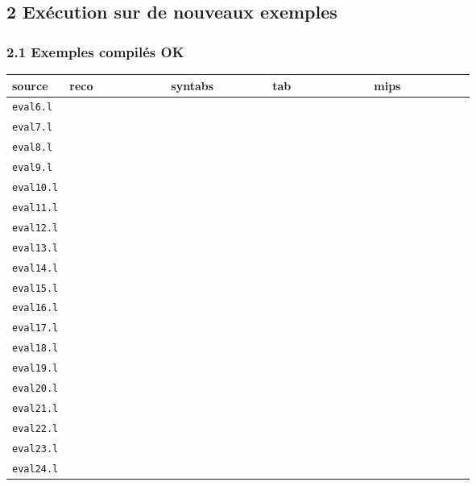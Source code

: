\documentclass[12pt,a4paper]{article}
\begin{document}
\subsection*{2 Exécution sur de nouveaux exemples}

\subsubsection*{2.1 Exemples compilés OK}


\begin{longtable}{|p{2.5cm}|l|l|l|l|} \hline
source       & reco & syntabs & tab & mips \\ \hline
\endhead
{\tt eval6.l} &~~~~~~~~~~~~~~~~   &~~~~~~~~~~~~~~~~   &~~~~~~~~~~~~~~~~ &~~~~~~~~~~~~~~~~        \\ \hline
{\tt eval7.l} &      &      &      &         \\ \hline
{\tt eval8.l} &      &      &      &         \\ \hline
{\tt eval9.l} &      &      &      &         \\ \hline
{\tt eval10.l} &      &      &      &         \\ \hline
{\tt eval11.l} &      &      &      &         \\ \hline
{\tt eval12.l} &      &      &      &         \\ \hline
{\tt eval13.l} &      &      &      &         \\ \hline
{\tt eval14.l} &      &      &      &         \\ \hline
{\tt eval15.l} &      &      &      &         \\ \hline
{\tt eval16.l} &      &      &      &         \\ \hline
{\tt eval17.l} &      &      &      &         \\ \hline
{\tt eval18.l} &      &      &      &         \\ \hline
{\tt eval19.l} &      &      &      &         \\ \hline
{\tt eval20.l} &      &      &      &         \\ \hline
{\tt eval21.l} &      &      &      &         \\ \hline
{\tt eval22.l} &      &      &      &         \\ \hline
{\tt eval23.l} &      &      &      &         \\ \hline
{\tt eval24.l} &      &      &      &         \\ \hline
\end{longtable}
\end{document}
